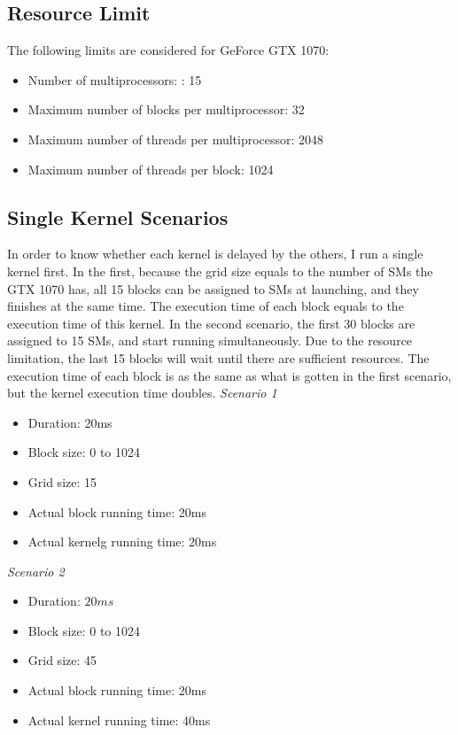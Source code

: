 \documentclass[12pt,journal,compsoc]{IEEEtran}
\begin{document}
\subsection{Resource Limit}
The following limits are considered for GeForce GTX 1070:
\begin{itemize}
   \item Number of multiprocessors: : 15
   \item Maximum number of blocks per multiprocessor: 32
   \item Maximum number of threads per multiprocessor: 2048
   \item Maximum number of threads per block: 1024
\end{itemize}

\subsection{Single Kernel Scenarios}
In order to know whether each kernel is delayed by the others, I run a single kernel first. In the first, because the grid size equals to the number of SMs the GTX 1070 has, all 15 blocks can be assigned to SMs at launching, and they finishes at the same time. The execution time of each block equals to the execution time of this kernel. In the second scenario, the first 30 blocks are assigned to 15 SMs, and start running simultaneously. Due to the resource limitation, the last 15 blocks will wait until there are sufficient resources. The execution time of each block is as the same as what is gotten in the first scenario, but the kernel execution time doubles. \newline
\textit{Scenario 1}
\begin{itemize}
   \item Duration: 20ms
   \item Block size: 0 to 1024
   \item Grid size: 15
   \item Actual block running time: 20ms
   \item Actual kernelg running time: 20ms
\end{itemize}
\textit{Scenario 2}
\begin{itemize}
   \item Duration: $20ms$
   \item Block size: 0 to 1024
   \item Grid size: 45
   \item Actual block running time: 20ms
   \item Actual kernel running time: 40ms
\end{itemize}
\end{document}

